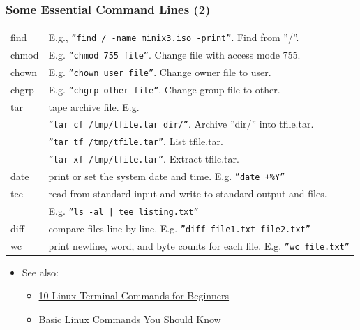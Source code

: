 \documentclass[aspectratio=169, xcolor=table, notheorems, hyperref={pdfpagelabels=false}]{beamer}
\begin{document}
\begin{frame}
\frametitle{Some Essential Command Lines (2)}
\begin{tabular}{l l}
\hline
find   & E.g., \texttt{''find / -name minix3.iso -print''}. Find from ''/''.      \\
chmod  & E.g. \texttt{''chmod 755 file''}. Change file with access mode 755.    \\
chown  & E.g. \texttt{''chown user file''}. Change owner file to user.          \\
chgrp  & E.g. \texttt{''chgrp other file''}. Change group file to other.        \\
tar    & tape archive file. E.g.                                                \\
       & \texttt{''tar cf /tmp/tfile.tar  dir/''}. Archive ''dir/'' into tfile.tar. \\
       & \texttt{''tar tf /tmp/tfile.tar''}. List tfile.tar.                   \\
       & \texttt{''tar xf /tmp/tfile.tar''}. Extract tfile.tar.                \\
date   & print or set the system date and time. E.g. \texttt{''date +\%Y''}     \\
tee    & read from standard input and write to standard output and files.      \\
       & E.g. \texttt{''ls -al | tee listing.txt''}                             \\
diff   & compare files line by line. E.g. \texttt{''diff file1.txt file2.txt''} \\
wc     & print newline, word, and byte counts for each file.  E.g. \texttt{''wc file.txt''}  \\
\hline
\end{tabular}

\begin{itemize}
\item See also:
\begin{itemize}
\item \href{https://www.youtube.com/watch?v=CpTfQ-q6MPU}{10 Linux Terminal Commands for Beginners}
\item \href{https://linuxopsys.com/topics/basic-linux-commands}{Basic Linux Commands You Should Know}
\end{itemize}
\end{itemize}
\end{frame}
\end{document}
